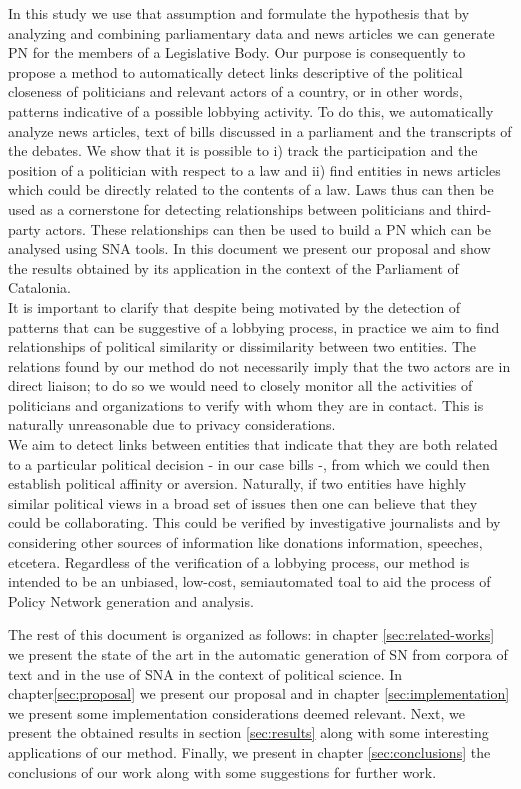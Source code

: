 In this study we use that assumption and formulate the hypothesis that by analyzing and combining parliamentary data and news articles we can generate PN for the members of a Legislative Body. Our purpose is consequently to propose a method to automatically detect links descriptive of the political closeness of politicians and relevant actors of a country, or in other words, patterns indicative of a possible lobbying activity. To do this, we automatically analyze news articles, text of bills discussed in a parliament and the transcripts of the debates. We show that it is possible to i) track the participation and the position of a politician with respect to a law and ii) find entities in news articles which could be directly related to the contents of a law. Laws thus can then be used as a cornerstone for detecting relationships between politicians and third-party actors. These relationships can then be used to build a PN which can be analysed using SNA tools. In this document we present our proposal and show the results obtained by its application in the context of the Parliament of Catalonia. \\

It is important to clarify that despite being motivated by the detection of patterns that can be suggestive of a lobbying process, in practice we aim to find relationships of political similarity or dissimilarity between two entities. The relations found by our method do not necessarily imply that the two actors are in direct liaison;  to do so we would need to closely monitor all the activities of politicians and organizations to verify with whom they are in contact. This is naturally unreasonable due to privacy considerations. \\

We aim to detect links between entities that indicate that they are both related to a particular political decision - in our case bills -, from which we could then establish political affinity or aversion. Naturally, if two entities have highly similar political views in a broad set of issues then one can believe that they could be collaborating. This could be verified by investigative journalists and by considering other sources of information like donations information, speeches, etcetera. Regardless of the verification of a lobbying process, our method is intended to be an unbiased, low-cost, semiautomated toal to aid the process of Policy Network generation and analysis. 

The rest of this document is organized as follows: in chapter \ref{sec:related-works} we present the state of the art in the automatic generation of SN from corpora of text and in the use of SNA in the context of political science. In chapter\ref{sec:proposal} we present our proposal and in chapter \ref{sec:implementation} we present some implementation considerations deemed relevant. Next, we present the obtained results in section \ref{sec:results} along with some interesting applications of our method. Finally, we present in chapter \ref{sec:conclusions} the conclusions of our work along with some suggestions for further work.

